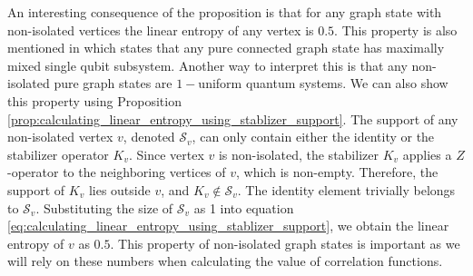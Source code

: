 \documentclass{article}
\begin{document}
An interesting consequence of the proposition is that for any graph state with non-isolated vertices the linear entropy of any vertex is $0.5$. This property is also mentioned in \cite{hein2006entanglement} which states that any pure connected graph state has maximally mixed single qubit subsystem. Another way to interpret this is that any non-isolated pure graph states are $1-$uniform quantum systems. We can also show this property using Proposition \ref{prop:calculating_linear_entropy_using_stablizer_support}. The support of any non-isolated vertex $v$, denoted $\mathcal{S}_v$, can only contain either the identity or the stabilizer operator $K_v$. Since vertex $v$ is non-isolated, the stabilizer $K_v$ applies a $Z$-operator to the neighboring vertices of $v$, which is non-empty. Therefore, the support of $K_v$ lies outside $v$, and $K_v \notin \mathcal{S}_v$. The identity element trivially belongs to $\mathcal{S}_v$. Substituting the size of $\mathcal{S}_v$ as 1 into equation \ref{eq:calculating_linear_entropy_using_stablizer_support}, we obtain the linear entropy of $v$ as $0.5$. This property of non-isolated graph states is important as we will rely on these numbers when calculating the value of correlation functions. 

\end{document}
